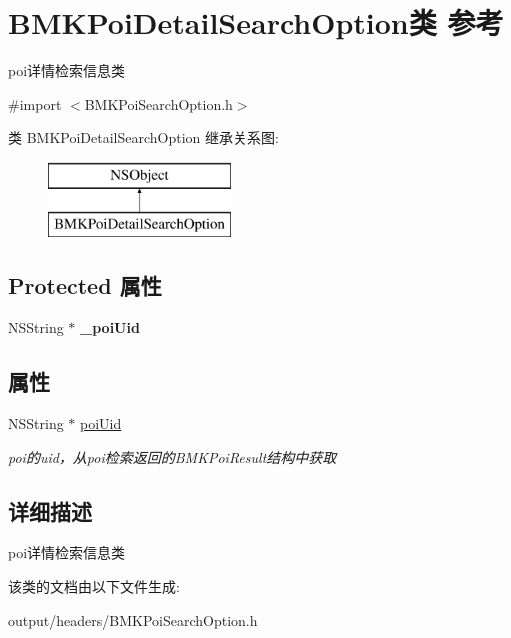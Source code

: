 \hypertarget{interface_b_m_k_poi_detail_search_option}{}\section{B\+M\+K\+Poi\+Detail\+Search\+Option类 参考}
\label{interface_b_m_k_poi_detail_search_option}


poi详情检索信息类  




{\ttfamily \#import $<$B\+M\+K\+Poi\+Search\+Option.\+h$>$}

类 B\+M\+K\+Poi\+Detail\+Search\+Option 继承关系图\+:\begin{figure}[H]
\begin{center}
\leavevmode
\includegraphics[height=2.000000cm]{interface_b_m_k_poi_detail_search_option}
\end{center}
\end{figure}
\subsection*{Protected 属性}
\begin{DoxyCompactItemize}
\item 
\hypertarget{interface_b_m_k_poi_detail_search_option_a9cbce2578220c6a05536df2200013659}{}N\+S\+String $\ast$ {\bfseries \+\_\+poi\+Uid}\label{interface_b_m_k_poi_detail_search_option_a9cbce2578220c6a05536df2200013659}

\end{DoxyCompactItemize}
\subsection*{属性}
\begin{DoxyCompactItemize}
\item 
\hypertarget{interface_b_m_k_poi_detail_search_option_a270c8018741875dc0bd80018b077952d}{}N\+S\+String $\ast$ \hyperlink{interface_b_m_k_poi_detail_search_option_a270c8018741875dc0bd80018b077952d}{poi\+Uid}\label{interface_b_m_k_poi_detail_search_option_a270c8018741875dc0bd80018b077952d}

\begin{DoxyCompactList}\small\item\em poi的uid，从poi检索返回的\+B\+M\+K\+Poi\+Result结构中获取 \end{DoxyCompactList}\end{DoxyCompactItemize}


\subsection{详细描述}
poi详情检索信息类 

该类的文档由以下文件生成\+:\begin{DoxyCompactItemize}
\item 
output/headers/B\+M\+K\+Poi\+Search\+Option.\+h\end{DoxyCompactItemize}
